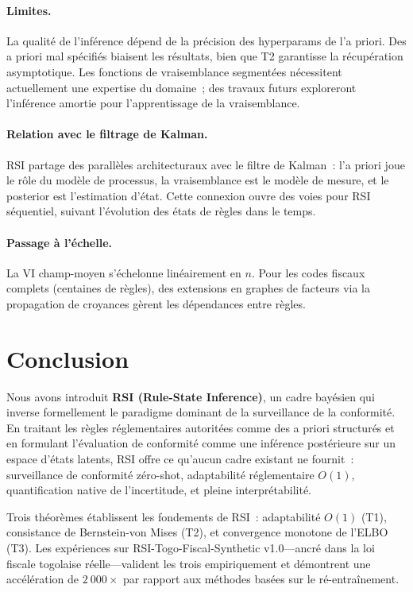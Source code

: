 \documentclass[letterpaper]{article}
\begin{document}
\paragraph{Limites.}
La qualit\'e de l'inf\'erence d\'epend de la pr\'ecision des
hyperparams de l'a priori. Des a priori mal sp\'ecifi\'es biaisent
les r\'esultats, bien que T2 garantisse la r\'ecup\'eration asymptotique.
Les fonctions de vraisemblance segment\'ees n\'ecessitent actuellement
une expertise du domaine~; des travaux futurs exploreront l'inf\'erence
amortie pour l'apprentissage de la vraisemblance.

\paragraph{Relation avec le filtrage de Kalman.}
RSI partage des parall\`eles architecturaux avec le filtre de Kalman~:
l'a priori joue le r\^ole du mod\`ele de processus, la vraisemblance
est le mod\`ele de mesure, et le posterior est l'estimation d'\'etat.
Cette connexion ouvre des voies pour RSI s\'equentiel, suivant
l'\'evolution des \'etats de r\`egles dans le temps.

\paragraph{Passage \`a l'\'echelle.}
La VI champ-moyen s'\'echelonne lin\'eairement en $n$. Pour les codes
fiscaux complets (centaines de r\`egles), des extensions en graphes
de facteurs via la propagation de croyances g\`erent les d\'ependances
entre r\`egles.

\section{Conclusion}
\label{sec:conclusion}

Nous avons introduit \textbf{RSI (Rule-State Inference)}, un cadre
bay\'esien qui inverse formellement le paradigme dominant de la
surveillance de la conformit\'e. En traitant les r\`egles r\'eglementaires
autorit\'ees comme des a priori structur\'es et en formulant l'\'evaluation
de conformit\'e comme une inf\'erence post\'erieure sur un espace
d'\'etats latents, RSI offre ce qu'aucun cadre existant ne fournit~:
surveillance de conformit\'e z\'ero-shot, adaptabilit\'e r\'eglementaire
$O(1)$, quantification native de l'incertitude, et pleine
interpr\'etabilit\'e.

Trois th\'eor\`emes \'etablissent les fondements de RSI~: adaptabilit\'e
$O(1)$ (T1), consistance de Bernstein-von Mises (T2), et convergence
monotone de l'ELBO (T3). Les exp\'eriences sur RSI-Togo-Fiscal-Synthetic
v1.0---ancr\'e dans la loi fiscale togolaise r\'eelle---valident les
trois empiriquement et d\'emontrent une acc\'el\'eration de $2~000\times$
par rapport aux m\'ethodes bas\'ees sur le r\'e-entra\^inement.
\end{document}
